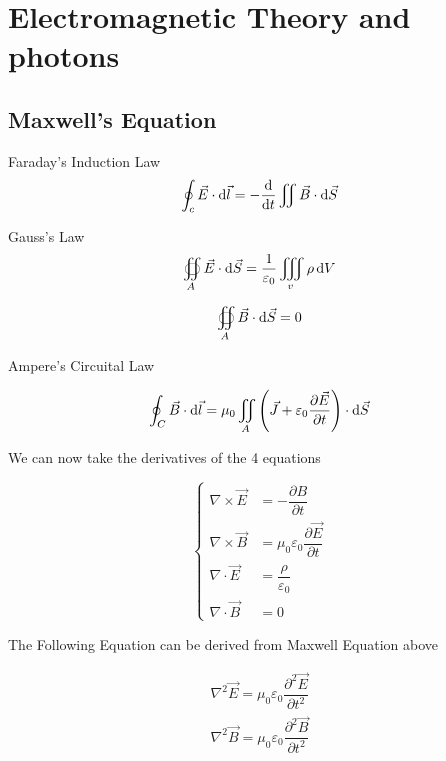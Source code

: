 \chapter{Electromagnetic Theory and photons}

\section{Maxwell's Equation}

Faraday's Induction Law
\begin{equation*}
  \oint_{c} \vec{E} \cdot \mathop{}\!\mathrm{d} \vec{l} = - \dfrac{\mathop{}\!\mathrm{d}}{\mathop{}\!\mathrm{d} t} \iint \vec{B} \cdot \mathop{}\!\mathrm{d} \vec{S}
\end{equation*}

Gauss's Law
\begin{equation*}
  \oiint_{A} \vec{E} \cdot \mathop{}\!\mathrm{d} \vec{S} = \dfrac{1}{\varepsilon_{0}} \iiint_{v} \rho \mathop{}\!\mathrm{d} V 
\end{equation*}

\begin{equation*}
  \oiint_{A} \vec{B} \cdot \mathop{}\!\mathrm{d} \vec{S} = 0
\end{equation*}

Ampere's Circuital Law

\begin{equation*}
  \oint_{C} \vec{B} \cdot \mathop{}\!\mathrm{d} \vec{l} = \mu_{0} \iint_{A} \left( \vec{J} + \varepsilon_{0} \dfrac{\partial \vec{E}}{\partial t}  \right) \cdot \mathop{}\!\mathrm{d} \vec{S}
\end{equation*}

We can now take the derivatives of the 4 equations

\begin{equation*}
  \left\{
  \begin{aligned}
    \nabla \times \vec{E} &= - \dfrac{\partial B}{\partial t} \\
    \nabla \times \vec{B} &= \mu_{0} \varepsilon_{0} \dfrac{\partial \vec{E}}{\partial t}  \\
    \nabla \cdot \vec{E} &= \dfrac{\rho}{\varepsilon_{0}} \\
    \nabla \cdot \vec{B} &= 0
  \end{aligned}
  \right.
\end{equation*}

The Following Equation can be derived from Maxwell Equation above

\begin{equation*}
  \begin{aligned}
    \nabla^{2} \vec{E} = \mu_{0} \varepsilon_{0} \dfrac{\partial^{2} \vec{E}}{\partial t^{2}}\\
    \nabla^{2} \vec{B} = \mu_{0} \varepsilon_{0} \dfrac{\partial^{2} \vec{B}}{\partial t^{2}} 
  \end{aligned}
\end{equation*}

